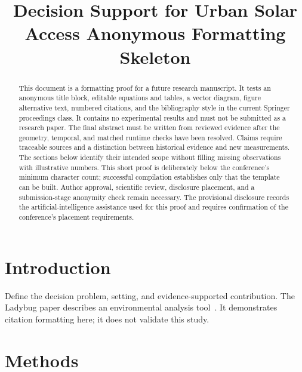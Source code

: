 \documentclass{llncs}
\begin{document}
\title{Decision Support for Urban Solar Access Anonymous Formatting Skeleton}
\author{}
\institute{}
\maketitle
\begin{abstract}
This document is a formatting proof for a future research manuscript. It tests
an anonymous title block, editable equations and tables, a vector diagram,
figure alternative text, numbered citations, and the bibliography style in the
current Springer proceedings class. It contains no experimental results and
must not be submitted as a research paper. The final abstract must be written
from reviewed evidence after the geometry, temporal, and matched runtime
checks have been resolved. Claims require traceable sources and a distinction
between historical evidence and new measurements. The sections below identify
their intended scope without filling missing observations with illustrative
numbers. This short proof is deliberately below the conference's minimum
character count; successful compilation establishes only that the template
can be built. Author approval, scientific review, disclosure placement, and
a submission-stage anonymity check remain necessary. The provisional
disclosure records the artificial-intelligence assistance used for this proof
and requires confirmation of the conference's placement requirements.
\end{abstract}

\section{Introduction}
Define the decision problem, setting, and evidence-supported contribution.
The Ladybug paper describes an environmental analysis
tool~\cite{roudsari2013ladybug}. It demonstrates citation formatting here;
it does not validate this study.

\section{Methods}
\end{document}
